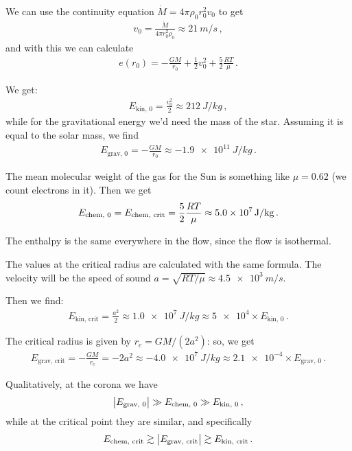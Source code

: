 \documentclass[main.tex]{subfiles}
\begin{document}
\begin{bluebox}
We can use the continuity equation \(\dot{M} = 4 \pi \rho_0 r_0^2 v_0 \) to get 
%
\begin{align}
  v_0 = \frac{\dot{M}}{4 \pi r_0^2 \rho_0 }
  \approx \SI{21}{m/s}
\,,
\end{align}
%
and with this we can calculate 
%
\begin{align}
  e(r_0 ) = - \frac{GM}{r_0 } + \frac{1}{2} v_0^2 + \frac{5}{2} \frac{RT}{\mu }
\,.
\end{align}

We get: 
%
\begin{align}
  E _{\text{kin, 0}} = \frac{v_0^2}{2} \approx \SI{212}{J/kg}
\,,
\end{align}
%
while for the gravitational energy we'd need the mass of the star. Assuming it is equal to the solar mass, we find 
%
\begin{align}
  E _{\text{grav, 0}} = -\frac{GM}{r_0 } \approx \SI{-1.9e11}{J/kg}
\,.
\end{align}
%

The mean molecular weight of the gas for the Sun is something like \(\mu = 0.62\) (we count electrons in it).
Then we get 
%
\begin{align}
  E _{\text{chem, 0}} = E _{\text{\text{chem, crit}}} = \frac{5}{2} \frac{RT}{\mu } \approx \SI{5.0e7}{J/kg}  
\,.
\end{align}
%

The enthalpy is the same everywhere in the flow, since the flow is isothermal.

The values at the critical radius are calculated with the same formula. The velocity will be the speed of sound \(a = \sqrt{RT / \mu } \approx \SI{4.5e3}{m/s} \).

Then we find: 
%
\begin{align}
  E _{\text{kin, crit}} = \frac{a^2}{2} \approx \SI{1.0e7}{J/kg} \approx \num{5e4} \times E _{\text{kin, 0}} 
\,.
\end{align}
%

The critical radius is given by \(r_c = GM / (2 a^2)\): so, we get 
%
\begin{align}
  E _{\text{grav, crit}} = - \frac{GM}{r_{c}} = -2 a^2 \approx - \SI{4.0e7}{J/kg} \approx \num{2.1e-4} \times E _{\text{grav, 0}}
\,.
\end{align}
%

Qualitatively, at the corona we have 
%
\begin{align}
   \abs{ E _{\text{grav, 0}}} \gg E _{\text{chem, 0}} \gg E _{\text{kin, 0}}
\,,
\end{align}
%
while at the critical point they are similar, and specifically 
%
\begin{align}
  E _{\text{chem, crit}} \gtrsim \abs{E _{\text{grav, crit}}} \gtrsim E _{\text{kin, crit}}
\,.
\end{align}
%

\end{bluebox}
\end{document}
